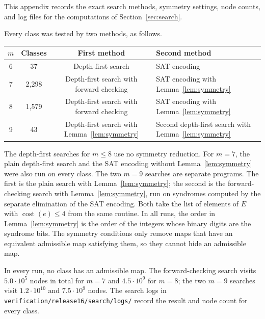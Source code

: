 \documentclass[11pt]{article}
\theoremstyle{definition}
\theoremstyle{remark}
\newcommand{\cost}{\operatorname{cost}}
\newcommand{\pathcode}[1]{{\small\nolinkurl{#1}}}
\begin{document}
This appendix records the exact search methods, symmetry settings, node
counts, and log files for the computations of Section~\ref{sec:search}.

Every class was tested by two methods, as follows.
\begin{center}\small
\begin{tabular}{@{}cccl@{}}\toprule
\(m\)&Classes&First method&Second method\\\midrule
6&37&Depth-first search&SAT encoding\\
7&2,298&Depth-first search with forward checking&SAT encoding with Lemma~\ref{lem:symmetry}\\
8&1,579&Depth-first search with forward checking&SAT encoding with Lemma~\ref{lem:symmetry}\\
9&43&Depth-first search with Lemma~\ref{lem:symmetry}&Second depth-first search with Lemma~\ref{lem:symmetry}\\\bottomrule
\end{tabular}
\end{center}
The depth-first searches for \(m\leq8\) use no symmetry reduction. For
\(m=7\), the plain depth-first search and the SAT encoding without
Lemma~\ref{lem:symmetry} were also run on every class. The two \(m=9\)
searches are separate programs. The first is the plain search with
Lemma~\ref{lem:symmetry}; the second is the forward-checking search with
Lemma~\ref{lem:symmetry}, run on syndromes computed by the separate
elimination of the SAT encoding. Both take the list of elements of \(E\)
with \(\cost(e)\leq4\) from the same routine. In all runs, the order in
Lemma~\ref{lem:symmetry} is the order of the integers whose binary
digits are the syndrome bits. The symmetry conditions only remove maps
that have an equivalent admissible map satisfying them, so they cannot
hide an admissible map.

In every run, no class has an admissible map. The forward-checking
search visits \(5.0\cdot10^5\) nodes in total for \(m=7\) and
\(4.5\cdot10^9\) for \(m=8\); the two \(m=9\) searches visit
\(1.2\cdot10^{10}\) and \(7.5\cdot10^9\) nodes. The search logs in
\pathcode{verification/release16/search/logs/} record the result and
node count for every class.
\end{document}
